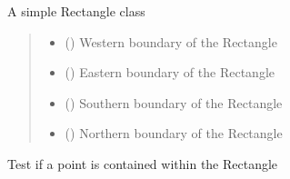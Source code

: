 \documentclass[letterpaper,10pt,english]{sphinxmanual}
\begin{document}
\begin{fulllineitems}
\label{\detokenize{users_guide:GeoSpatialTools.quadtree.Rectangle}}
\pysigstartsignatures
\pysiglinewithargsret
{}
{\sphinxparamcomma {}\sphinxparamcomma {}\sphinxparamcomma {}}
{}
\pysigstopsignatures
\sphinxAtStartPar
A simple Rectangle class
\begin{quote}\begin{description}
\begin{itemize}
\item {} 
\sphinxAtStartPar
{} () \textendash{} Western boundary of the Rectangle

\item {} 
\sphinxAtStartPar
{} () \textendash{} Eastern boundary of the Rectangle

\item {} 
\sphinxAtStartPar
{} () \textendash{} Southern boundary of the Rectangle

\item {} 
\sphinxAtStartPar
{} () \textendash{} Northern boundary of the Rectangle

\end{itemize}

\end{description}\end{quote}

\begin{fulllineitems}
\label{\detokenize{users_guide:GeoSpatialTools.quadtree.Rectangle.contains}}
\pysigstartsignatures
\pysiglinewithargsret
{}
{}
{}
\pysigstopsignatures
\sphinxAtStartPar
Test if a point is contained within the Rectangle
\begin{quote}\begin{description}
\sphinxAtStartPar
{}


\end{description}
\end{quote}
\end{fulllineitems}
\end{fulllineitems}
\end{document}
